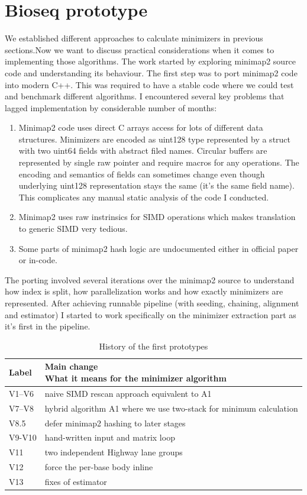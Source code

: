 \section{Bioseq prototype}

We established different approaches to calculate minimizers in previous sections.Now we want to discuss practical considerations when it comes to implementing those algorithms.
The work started by exploring minimap2 source code and understanding its behaviour. The first step was to port minimap2 code into modern C++. This was required to have a stable code where we could test and benchmark different algorithms.
I encountered several key problems that lagged implementation by considerable number of months:
\begin{enumerate}
  \item Minimap2 code uses direct C arrays access for lots of different data structures. Minimizers are encoded as uint128 type represented by a struct with two uint64 fields with abstract filed names. Circular buffers are represented by single raw pointer and require macros for any operations. The encoding and semantics of fields can sometimes change even though underlying uint128 representation stays the same (it's the same field name). This complicates any manual static analysis of the code I conducted.
  \item Minimap2 uses raw instrinsics for SIMD operations which makes translation to generic SIMD very tedious.
  \item Some parts of minimap2 hash logic are undocumented either in official paper or in-code.
\end{enumerate}

The porting involved several iterations over the minimap2 source to understand how index is split, how parallelization works and how exactly minimizers are represented.
After achieving runnable pipeline (with seeding, chaining, alignment and estimator) I started to work specifically on the minimizer extraction part as it's first in the pipeline.


\begin{table}[H]
  \centering
  \footnotesize
  \begin{tabularx}{\linewidth}{@{}p{.13\linewidth}X@{}}
  \toprule
  Label & \shortstack[l]{Main change\\What it means for the minimizer algorithm} \\
  \midrule
  V1--V6 & naive SIMD rescan approach equivalent to A1 \\
  V7--V8 & hybrid algorithm A1 where we use two-stack for minimum calculation \\
  V8.5 & defer minimap2 hashing to later stages \\
  V9-V10 & hand-written input and matrix loop \\
  V11 & two independent Highway lane groups \\
  V12 & force the per-base body inline \\
  V13 & fixes of estimator \\
  \bottomrule
  \end{tabularx}
  \caption{History of the first prototypes}
  \label{tab:rewrite-version-history}
  \end{table}


